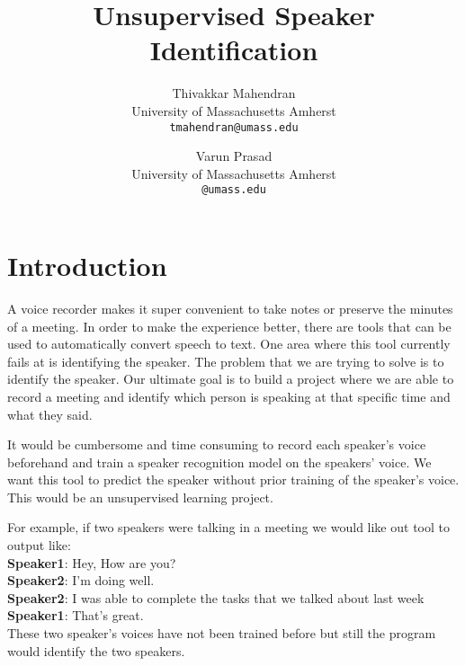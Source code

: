 \documentclass[10pt,twocolumn,letterpaper]{article}
\begin{document}
\title{Unsupervised Speaker Identification}

\author{Thivakkar Mahendran\\
University of Massachusetts Amherst\\
{\tt\small tmahendran@umass.edu}
\and
Varun Prasad\\
University of Massachusetts Amherst\\
{\tt\small @umass.edu}
}

\maketitle



\section{Introduction}

A voice recorder makes it super convenient to take notes or preserve the minutes of a meeting. In order to make the experience better, there are tools that can be used to automatically convert speech to text. One area where this tool currently fails at is identifying the speaker. The problem that we are trying to solve is to identify the speaker. Our ultimate goal is to build a project where we are able to record a meeting and identify which person is speaking at that specific time and what they said.

It would be cumbersome and time consuming to record each speaker’s voice beforehand and train a speaker recognition model on the speakers’ voice. We want this tool to predict the speaker without prior training of the speaker’s voice. This would be an unsupervised learning project. 

For example, if two speakers were talking in a meeting we would like out tool to output like:
\\ {\bf Speaker1}: Hey, How are you?
\\ {\bf Speaker2}: I’m doing well.
\\ {\bf Speaker2}: I was able to complete the tasks that we talked about last week
\\ {\bf Speaker1}: That’s great.
\\ These two speaker’s voices have not been trained before but still the program would identify the two speakers. 
\end{document}
